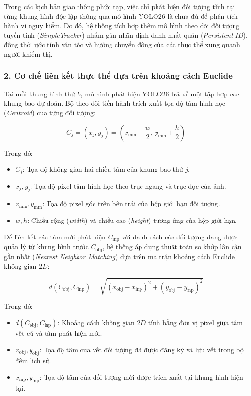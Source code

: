 Trong các kịch bản giao thông phức tạp, việc chỉ phát hiện đối tượng tĩnh tại từng khung hình độc lập thông qua mô hình YOLO26 là chưa đủ để phân tích hành vi nguy hiểm. Do đó, hệ thống tích hợp thêm mô hình theo dõi đối tượng tuyến tính (\textit{SimpleTracker}) nhằm gán nhãn định danh nhất quán (\textit{Persistent ID}), đồng thời ước tính vận tốc và hướng chuyển động của các thực thể xung quanh người khiếm thị.

\subsubsection*{2. Cơ chế liên kết thực thể dựa trên khoảng cách Euclide}

Tại mỗi khung hình thứ $k$, mô hình phát hiện YOLO26 trả về một tập hợp các khung bao dự đoán. Bộ theo dõi tiến hành trích xuất tọa độ tâm hình học (\textit{Centroid}) của từng đối tượng:

\begin{equation}
    C_j = \left( x_j, y_j \right) = \left( x_{\text{min}} + \frac{w}{2}, \, y_{\text{min}} + \frac{h}{2} \right)
\end{equation}

Trong đó:
\begin{itemize}
    \item $C_j$: Tọa độ không gian hai chiều tâm của khung bao thứ $j$.
    \item $x_j, y_j$: Tọa độ pixel tâm hình học theo trục ngang và trục dọc của ảnh.
    \item $x_{\text{min}}, y_{\text{min}}$: Tọa độ pixel góc trên bên trái của hộp giới hạn đối tượng.
    \item $w, h$: Chiều rộng (\textit{width}) và chiều cao (\textit{height}) tương ứng của hộp giới hạn.
\end{itemize}

Để liên kết các tâm mới phát hiện $C_{\text{inp}}$ với danh sách các đối tượng đang được quản lý từ khung hình trước $C_{\text{obj}}$, hệ thống áp dụng thuật toán so khớp lân cận gần nhất (\textit{Nearest Neighbor Matching}) dựa trên ma trận khoảng cách Euclide không gian $2D$:

\begin{equation}
    d(C_{\text{obj}}, C_{\text{inp}}) = \sqrt{(x_{\text{obj}} - x_{\text{inp}})^2 + (y_{\text{obj}} - y_{\text{inp}})^2}
\end{equation}

Trong đó:
\begin{itemize}
    \item $d(C_{\text{obj}}, C_{\text{inp}})$: Khoảng cách không gian $2D$ tính bằng đơn vị pixel giữa tâm vết cũ và tâm phát hiện mới.
    \item $x_{\text{obj}}, y_{\text{obj}}$: Tọa độ tâm của vết đối tượng đã được đăng ký và lưu vết trong bộ đệm lịch sử.
    \item $x_{\text{inp}}, y_{\text{inp}}$: Tọa độ tâm của đối tượng mới được trích xuất tại khung hình hiện tại.
\end{itemize}


